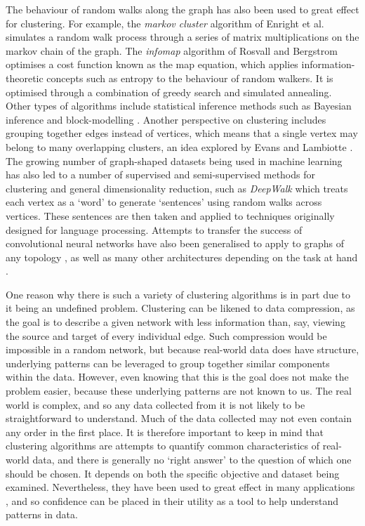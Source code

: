 The behaviour of random walks along the graph has also been used to great effect for clustering. For example, the \emph{markov cluster} algorithm of Enright et al.~\cite{Enright2002} simulates a random walk process through a series of matrix multiplications on the markov chain of the graph.
The \emph{infomap} algorithm of Rosvall and Bergstrom \cite{Rosvall2008} optimises a cost function known as the map equation, which applies information-theoretic concepts such as entropy to the behaviour of random walkers. It is optimised through a combination of greedy search and simulated annealing.
Other types of algorithms include statistical inference methods such as Bayesian inference \cite{Hastings2006} and block-modelling \cite{Reichardt2007}.
Another perspective on clustering includes grouping together edges instead of vertices, which means that a single vertex may belong to many overlapping clusters, an idea explored by Evans and Lambiotte \cite{Evans2009}.
The growing number of graph-shaped datasets being used in machine learning has also led to a number of supervised and semi-supervised methods for clustering and general dimensionality reduction, such as \emph{DeepWalk} \cite{Perozzi2014} which treats each vertex as a `word' to generate `sentences' using random walks across vertices. These sentences are then taken and applied to techniques originally designed for language processing. Attempts to transfer the success of convolutional neural networks have also been generalised to apply to graphs of any topology \cite{Kipf2016}, as well as many other architectures depending on the task at hand \cite{Battaglia2018, Wu2020}.

One reason why there is such a variety of clustering algorithms is in part due to it being an undefined problem.
Clustering can be likened to data compression, as the goal is to describe a given network with less information than, say, viewing the source and target of every individual edge. Such compression would be impossible in a random network, but because real-world data does have structure, underlying patterns can be leveraged to group together similar components within the data.
However, even knowing that this is the goal does not make the problem easier, because these underlying patterns are not known to us. The real world is complex, and so any data collected from it is not likely to be straightforward to understand. Much of the data collected may not even contain any order in the first place.
It is therefore important to keep in mind that clustering algorithms are attempts to quantify common characteristics of real-world data, and there is generally no `right answer' to the question of which one should be chosen.
It depends on both the specific objective and dataset being examined. Nevertheless, they have been used to great effect in many applications \cite{Fortunato2016}, and so confidence can be placed in their utility as a tool to help understand patterns in data.

